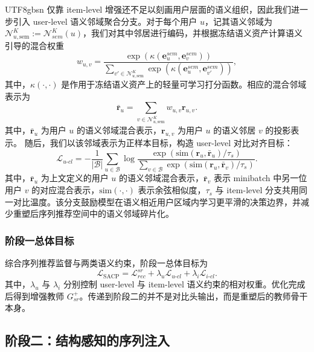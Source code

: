 \documentclass{article}
\begin{document}
\begin{CJK*}{UTF8}{gbsn}
仅靠 item-level 增强还不足以刻画用户层面的语义组织，因此我们进一步引入 user-level 语义邻域聚合分支。对于每个用户 $u$，记其语义邻域为 $\mathcal{N}_{u,\mathrm{sem}}^K:=\mathcal{N}_{sem}^{K}(u)$，我们对其中邻居进行编码，并根据冻结语义资产计算语义引导的混合权重
\begin{equation}
w_{u,v}
=
\frac{\exp(\kappa(\mathbf{e}_u^{sem},\mathbf{e}_v^{sem}))}
{\sum_{v'\in\mathcal{N}_{u,\mathrm{sem}}^K}\exp(\kappa(\mathbf{e}_u^{sem},\mathbf{e}_{v'}^{sem}))},
\end{equation}
其中，$\kappa(\cdot,\cdot)$ 是作用于冻结语义资产上的轻量可学习打分函数。相应的混合邻域表示为
\begin{equation}
\bar{\mathbf{r}}_u=\sum_{v\in\mathcal{N}_{u,\mathrm{sem}}^K}w_{u,v}\mathbf{r}_{u,v}.
\end{equation}
其中，$\bar{\mathbf{r}}_u$ 为用户 $u$ 的语义邻域混合表示，$\mathbf{r}_{u,v}$ 为用户 $u$ 的语义邻居 $v$ 的投影表示。
随后，我们以该邻域表示为正样本目标，构造 user-level 对比对齐目标：
\begin{equation}
\mathcal{L}_{u\text{-}cl}
=-\frac{1}{|\mathcal{B}|}\sum_{u\in\mathcal{B}}
\log
\frac{\exp(\mathrm{sim}(\mathbf{r}_u,\bar{\mathbf{r}}_u)/\tau_s)}
{\sum_{v\in\mathcal{B}}
\exp(\mathrm{sim}(\mathbf{r}_u,\bar{\mathbf{r}}_v)/\tau_s)}.
\end{equation}
其中，$\bar{\mathbf{r}}_u$ 为上文定义的用户 $u$ 的语义邻域混合表示，$\bar{\mathbf{r}}_v$ 表示 minibatch 中另一位用户 $v$ 的对应混合表示，$\mathrm{sim}(\cdot,\cdot)$ 表示余弦相似度，$\tau_s$ 与 item-level 分支共用同一对比温度。该分支鼓励模型在语义相近用户区域内学习更平滑的决策边界，并减少重塑后序列推荐空间中的语义邻域碎片化。

\subsubsection{阶段一总体目标}

综合序列推荐监督与两类语义约束，阶段一总体目标为
\begin{equation}
\mathcal{L}_{\text{SACP}}
=
\mathcal{L}_{rec}^{sr}
+\lambda_u \mathcal{L}_{u\text{-}cl}
+\lambda_i \mathcal{L}_{i\text{-}cl}.
\end{equation}
其中，$\lambda_u$ 与 $\lambda_i$ 分别控制 user-level 与 item-level 语义约束的相对权重。优化完成后得到增强教师 $G_{sr}^{+}$。传递到阶段二的并不是对比头输出，而是重塑后的教师骨干本身。

\subsection{阶段二：结构感知的序列注入}


\end{CJK*}
\end{document}
